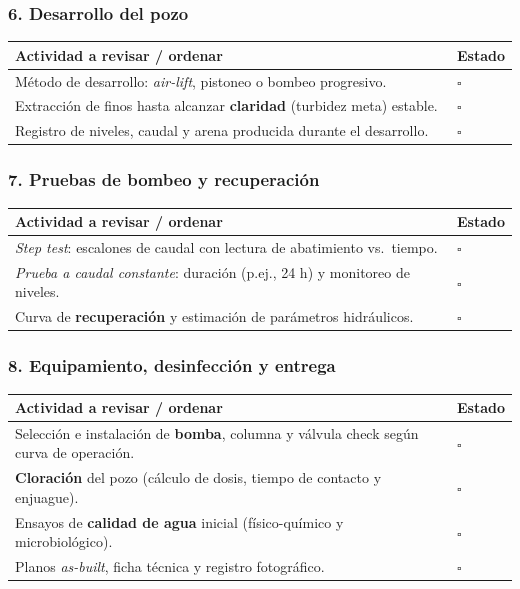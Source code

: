 \documentclass[12pt]{article}
\newcommand{\cbox}{\(\square\)} %
\begin{document}
	\subsubsection*{6. Desarrollo del pozo}
	\begin{tabularx}{\linewidth}{>{\raggedright\arraybackslash}p{0.93\linewidth} >{\centering\arraybackslash}m{0.07\linewidth}}
		\toprule
		\textbf{Actividad a revisar / ordenar} & \textbf{Estado}\\
		\midrule
		Método de desarrollo: \emph{air-lift}, pistoneo o bombeo progresivo. & \cbox \\
		Extracción de finos hasta alcanzar \textbf{claridad} (turbidez meta) estable. & \cbox \\
		Registro de niveles, caudal y arena producida durante el desarrollo. & \cbox \\
		\bottomrule
	\end{tabularx}
	
	\subsubsection*{7. Pruebas de bombeo y recuperación}
	\begin{tabularx}{\linewidth}{>{\raggedright\arraybackslash}p{0.93\linewidth} >{\centering\arraybackslash}m{0.07\linewidth}}
		\toprule
		\textbf{Actividad a revisar / ordenar} & \textbf{Estado}\\
		\midrule
		\emph{Step test}: escalones de caudal con lectura de abatimiento vs.\ tiempo. & \cbox \\
		\emph{Prueba a caudal constante}: duración (p.ej., 24 h) y monitoreo de niveles. & \cbox \\
		Curva de \textbf{recuperación} y estimación de parámetros hidráulicos. & \cbox \\
		\bottomrule
	\end{tabularx}
	
	\subsubsection*{8. Equipamiento, desinfección y entrega}
	\begin{tabularx}{\linewidth}{>{\raggedright\arraybackslash}p{0.93\linewidth} >{\centering\arraybackslash}m{0.07\linewidth}}
		\toprule
		\textbf{Actividad a revisar / ordenar} & \textbf{Estado}\\
		\midrule
		Selección e instalación de \textbf{bomba}, columna y válvula check según curva de operación. & \cbox \\
		\textbf{Cloración} del pozo (cálculo de dosis, tiempo de contacto y enjuague). & \cbox \\
		Ensayos de \textbf{calidad de agua} inicial (físico-químico y microbiológico). & \cbox \\
		Planos \textit{as-built}, ficha técnica y registro fotográfico. & \cbox \\
		\bottomrule
	\end{tabularx}
	
\end{document}
